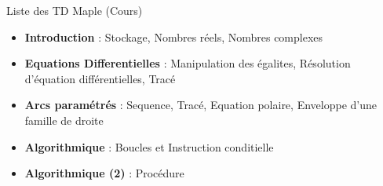 \documentclass[a4paper,12pt,oneside]{report}
\begin{document}
\begin{center}
\begin{LARGE}Liste des TD Maple (Cours) \end{LARGE}
\end{center}\begin{itemize}
 \item \textbf{Introduction} : Stockage, Nombres réels, Nombres complexes \\
 \item \textbf{Equations Differentielles} : Manipulation des égalites, Résolution d'équation différentielles, Tracé \\
 \item \textbf{Arcs paramétrés} : Sequence, Tracé, Equation polaire, Enveloppe d'une famille de droite \\
 \item \textbf{Algorithmique} : Boucles et Instruction conditielle\\
 \item \textbf{Algorithmique (2)} : Procédure\\
\end{itemize}
\end{document}
